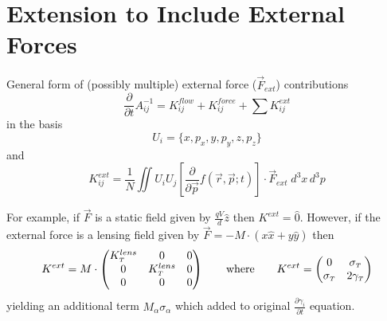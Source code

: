
\section{Extension to Include External Forces}

General form of (possibly multiple) external force ($\vec{F}_{ext}$) contributions
\begin{equation}
  \frac{\partial}{\partial t} A^{-1}_{ij} = K^{flow}_{ij} + K^{force}_{ij} + \sum K^{ext}_{ij}
\end{equation}
in the basis
\begin{equation}
  U_{i} = \lbrace x, p_x, y, p_y, z, p_z \rbrace
\end{equation}
and
\begin{equation}
  K^{ext}_{ij} = \frac{1}{N} \iint U_i U_j \left [ \frac{\partial}{\partial \vec{p}} f(\vec{r}, \vec{p}; t) \right ] \cdot \vec{F}_{ext}\;d^{3}x\,d^{3}p
\end{equation}

For example, if $\vec{F}$ is a static field given by $\frac{qV}{d}\hat{z}$ then $K^{ext} = \hat{0}$. However, if the external force is a lensing field given by $\vec{F} = -M\cdot(x\hat{x}+y\hat{y})$ then 
\begin{equation}
  K^{ext} = M \cdot 
  \begin{pmatrix}
    K^{lens}_{{\scriptscriptstyle T}} & 0 & 0 \\
    0 & K^{lens}_{{\scriptscriptstyle T}} & 0 \\
    0 & 0 & 0
  \end{pmatrix}
  \qquad \text{where} \qquad
  K^{ext} = 
  \begin{pmatrix}
    0 & \sigma_{{\scriptscriptstyle T}} \\
    \sigma_{{\scriptscriptstyle T}} & 2 \gamma_{{\scriptscriptstyle T}}
  \end{pmatrix}
\end{equation}
yielding an additional term $M_{\alpha} \sigma_{\alpha}$ which added to original $\frac{\partial \gamma_i}{\partial t}$ equation.